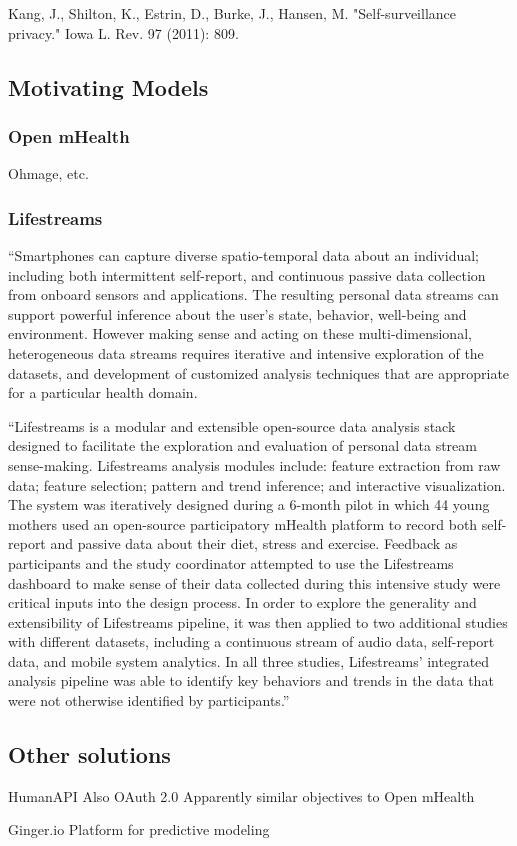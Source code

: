 Kang, J., Shilton, K., Estrin, D., Burke, J., Hansen, M. "Self-surveillance privacy." Iowa L. Rev. 97 (2011): 809.

\subsection{Motivating Models}

\subsubsection{Open mHealth}
Ohmage, etc.

\subsubsection{Lifestreams}

``Smartphones can capture diverse spatio-temporal data about an individual; including both intermittent self-report, and continuous passive data collection from onboard sensors and applications. The resulting personal data streams can support powerful inference about the user's state, behavior, well-being and environment. However making sense and acting on these multi-dimensional, heterogeneous data streams requires iterative and intensive exploration of the datasets, and development of customized analysis techniques that are appropriate for a particular health domain.

``Lifestreams is a modular and extensible open-source data analysis stack designed to facilitate the exploration and evaluation of personal data stream sense-making. Lifestreams analysis modules include: feature extraction from raw data; feature selection; pattern and trend inference; and interactive visualization. The system was iteratively designed during a 6-month pilot in which 44 young mothers used an open-source participatory mHealth platform to record both self-report and passive data about their diet, stress and exercise. Feedback as participants and the study coordinator attempted to use the Lifestreams dashboard to make sense of their data collected during this intensive study were critical inputs into the design process. In order to explore the generality and extensibility of Lifestreams pipeline, it was then applied to two additional studies with different datasets, including a continuous stream of audio data, self-report data, and mobile system analytics. In all three studies, Lifestreams' integrated analysis pipeline was able to identify key behaviors and trends in the data that were not otherwise identified by participants.''
\cite{hsieh2013lifestreams}


\subsection{Other solutions}

HumanAPI
Also OAuth 2.0
Apparently similar objectives to Open mHealth

Ginger.io
Platform for predictive modeling
